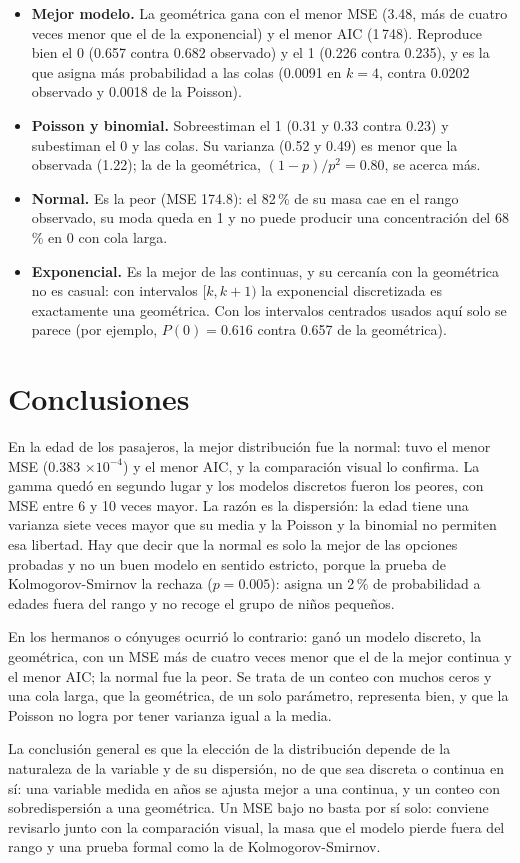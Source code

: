 \documentclass[11pt,letterpaper]{article}
\begin{document}
\begin{itemize}
    \item \textbf{Mejor modelo.} La geométrica gana con el menor MSE (3.48, más de cuatro veces menor que el de la exponencial) y el menor AIC (1\,748). Reproduce bien el 0 (0.657 contra 0.682 observado) y el 1 (0.226 contra 0.235), y es la que asigna más probabilidad a las colas (0.0091 en $k = 4$, contra 0.0202 observado y 0.0018 de la Poisson).
    \item \textbf{Poisson y binomial.} Sobreestiman el 1 (0.31 y 0.33 contra 0.23) y subestiman el 0 y las colas. Su varianza (0.52 y 0.49) es menor que la observada (1.22); la de la geométrica, $(1-p)/p^2 = 0.80$, se acerca más.
    \item \textbf{Normal.} Es la peor (MSE 174.8): el 82\,\% de su masa cae en el rango observado, su moda queda en 1 y no puede producir una concentración del 68\,\% en 0 con cola larga.
    \item \textbf{Exponencial.} Es la mejor de las continuas, y su cercanía con la geométrica no es casual: con intervalos $[k, k+1)$ la exponencial discretizada es exactamente una geométrica. Con los intervalos centrados usados aquí solo se parece (por ejemplo, $P(0) = 0.616$ contra 0.657 de la geométrica).
\end{itemize}

\section{Conclusiones}

En la edad de los pasajeros, la mejor distribución fue la normal: tuvo el menor MSE (0.383 $\times 10^{-4}$) y el menor AIC, y la comparación visual lo confirma. La gamma quedó en segundo lugar y los modelos discretos fueron los peores, con MSE entre 6 y 10 veces mayor. La razón es la dispersión: la edad tiene una varianza siete veces mayor que su media y la Poisson y la binomial no permiten esa libertad. Hay que decir que la normal es solo la mejor de las opciones probadas y no un buen modelo en sentido estricto, porque la prueba de Kolmogorov-Smirnov la rechaza ($p = 0.005$): asigna un 2\,\% de probabilidad a edades fuera del rango y no recoge el grupo de niños pequeños.

En los hermanos o cónyuges ocurrió lo contrario: ganó un modelo discreto, la geométrica, con un MSE más de cuatro veces menor que el de la mejor continua y el menor AIC; la normal fue la peor. Se trata de un conteo con muchos ceros y una cola larga, que la geométrica, de un solo parámetro, representa bien, y que la Poisson no logra por tener varianza igual a la media.

La conclusión general es que la elección de la distribución depende de la naturaleza de la variable y de su dispersión, no de que sea discreta o continua en sí: una variable medida en años se ajusta mejor a una continua, y un conteo con sobredispersión a una geométrica. Un MSE bajo no basta por sí solo: conviene revisarlo junto con la comparación visual, la masa que el modelo pierde fuera del rango y una prueba formal como la de Kolmogorov-Smirnov.

\end{document}

